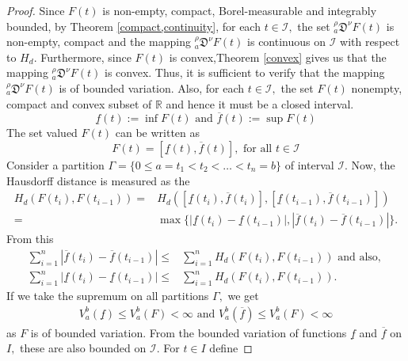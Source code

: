 \documentclass{amsproc}
\theoremstyle{definition}
\theoremstyle{remark}
\numberwithin{equation}{section}
\begin{document}
 \begin{proof}
     Since $F(t)$ is non-empty, compact, Borel-measurable and integrably bounded, by Theorem \ref{compact,continuity}, for each $t\in \mathcal{I},$ the set $_a^\rho\mathfrak{D}^\nu F(t)$ is non-empty, compact and the mapping $_a^\rho\mathfrak{D}^\nu F(t)$ is continuous on $\mathcal{I}$ with respect to $H_d.$ Furthermore, since $F(t)$ is convex,Theorem \ref{convex} gives us that the mapping $_a^\rho\mathfrak{D}^\nu F(t)$ is convex. Thus, it is sufficient to verify that the mapping $_a^\rho\mathfrak{D}^\nu F(t)$ is of bounded variation. Also, for each $t\in \mathcal{I},$ the set $ F(t)$ nonempty, compact and convex subset of $\mathbb{R}$ and hence it must be a closed interval. 
     \[ \underline{f}(t):= \inf F(t)  \text{ and } \overline{f}(t):=\sup F(t) \]
    The set valued $F(t)$ can be written as 
    \[ F(t)= [\underline{f}(t),\overline{f}(t)], \text{ for all } t\in \mathcal{I} \] 
  Consider a partition $\Gamma=\{0\le a=t_1 <t_2 <\ldots < t_n=b \}$ of interval $\mathcal{I}.$ Now, the Hausdorff distance is measured as the 
  \begin{equation*}
      \begin{aligned}
  H_d(F(t_i),F(t_{i-1}))=& H_d([\underline{f}(t_i),\overline{f}(t_i)],[\underline{f}(t_{i-1}),\overline{f}(t_{i-1})])\\
  =&\max \big\{ |\underline{f}(t_i)-\underline{f}(t_{i-1})|, |\overline{f}(t_{i})-\overline{f}(t_{i-1})|\big\}.
   \end{aligned}
  \end{equation*}
  From this 
   \begin{equation*}
       \begin{aligned}
           \sum_{i=1}^{n}|\overline{f}(t_{i})-\overline{f}(t_{i-1})|\le& \sum_{i=1}^nH_d(F(t_i),F(t_{i-1}))  \text{ and also, } \\
           \sum_{i=1}^{n}|\underline{f}(t_i)-\underline{f}(t_{i-1})|\le& \sum_{i=1}^nH_d(F(t_i),F(t_{i-1})).
       \end{aligned}
   \end{equation*}
  If we take the supremum on all partitions $\Gamma,$ we get
  \begin{equation*}
      \begin{aligned}
          V_a^b(\underline{f})\le V_a^b(F)< \infty  \text{ and }  V_a^b(\overline{f})\le V_a^b(F) < \infty
      \end{aligned}
  \end{equation*}
as $F$ is of bounded variation. From the bounded variation of functions $\underline{f}$ and $ \overline{f}$ on $I,$ these are also bounded on $\mathcal{I}.$ For $t\in I$ define 

\end{proof}
\end{document}
